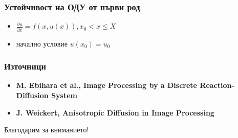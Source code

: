 \documentclass[14pt]{beamer}
\begin{document}

\begin{frame}
\frametitle{Устойчивост на ОДУ от първи род}
\begin{itemize}
\item $\frac{\partial u}{\partial x} = f(x,u(x)), x_0 < x \leq X$
\item начално условие $u(x_0) = u_0$
\end{itemize}
\end{frame}

\begin{frame}
\frametitle{Източници}
\begin{itemize}
\item \textbf{M. Ebihara et al., Image Processing by a Discrete Reaction-Diffusion System}
\item \textbf{J. Weickert, Anisotropic Diffusion in Image Processing}
\end{itemize}
\end{frame}

\begin{frame}
\begin{center}
Благодарим за вниманието!
\end{center}
\end{frame}
\end{document}
